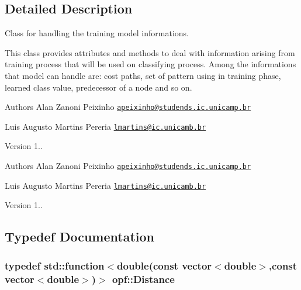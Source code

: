 \subsection{Detailed Description}
Class for handling the training model informations. 

This class provides attributes and methods to deal with information arising from training process that will be used on classifying process. Among the informations that model can handle are\+: cost paths, set of pattern using in training phase, learned class value, predecessor of a node and so on. \begin{DoxyAuthor}{Authors}
Alan Zanoni Peixinho \href{mailto:apeixinho@studends.ic.unicamp.br}{\tt apeixinho@studends.\+ic.\+unicamp.\+br} 

Luis Augusto Martins Pereria \href{mailto:lmartins@ic.unicamb.br}{\tt lmartins@ic.\+unicamb.\+br} 
\end{DoxyAuthor}
\begin{DoxyVersion}{Version}
1..
\end{DoxyVersion}
\begin{DoxyAuthor}{Authors}
Alan Zanoni Peixinho \href{mailto:apeixinho@studends.ic.unicamp.br}{\tt apeixinho@studends.\+ic.\+unicamp.\+br} 

Luis Augusto Martins Pereria \href{mailto:lmartins@ic.unicamb.br}{\tt lmartins@ic.\+unicamb.\+br} 
\end{DoxyAuthor}
\begin{DoxyVersion}{Version}
1.. 
\end{DoxyVersion}


\subsection{Typedef Documentation}
\hypertarget{namespaceopf_a61631393754e0aa6aaeacf0767b2b419}{
\subsubsection[{Distance}]{\setlength{\rightskip}{0pt plus 5cm}typedef std\+::function$<$double(const vector$<$double$>$,const vector$<$double$>$)$>$ {\bf opf\+::\+Distance}}}\label{namespaceopf_a61631393754e0aa6aaeacf0767b2b419}


